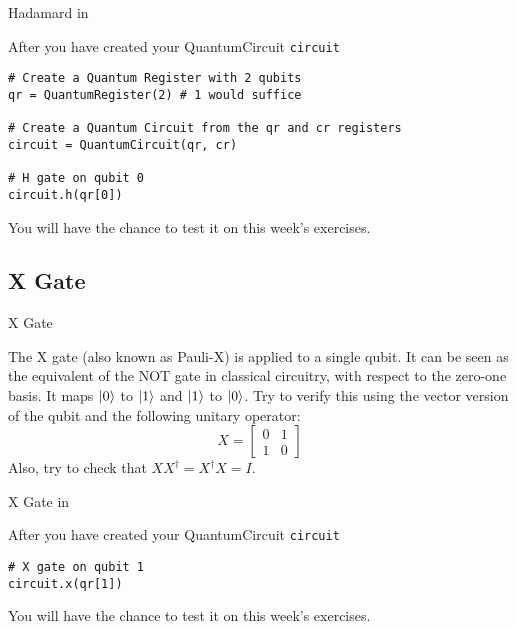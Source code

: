 \documentclass[aspectratio=43]{beamer}
\begin{document}
\begin{frame}[fragile]{Hadamard in \qk}
\begin{card}
    After you have created your QuantumCircuit \texttt{circuit}
    \begin{verbatim}
# Create a Quantum Register with 2 qubits
qr = QuantumRegister(2) # 1 would suffice

# Create a Quantum Circuit from the qr and cr registers
circuit = QuantumCircuit(qr, cr)

# H gate on qubit 0
circuit.h(qr[0])
    \end{verbatim}
    \begin{center}
            
    \end{center}
    You will have the chance to test it on this week's exercises.
\end{card}
\end{frame}


\subsection{X Gate}
\begin{frame}{X Gate}
\begin{card}
    The X gate (also known as Pauli-X) is applied to a single qubit. It can be seen as the equivalent of the NOT gate in classical circuitry, with respect to the zero-one basis. It maps $\ket{0}$ to $\ket{1}$ and $\ket{1}$ to $\ket{0}$. Try to verify this using the vector version of the qubit and the following unitary operator:
    \begin{equation*}
        X=\begin{bmatrix}0 & 1\\1 & 0\end{bmatrix}
    \end{equation*}
    Also, try to check that $XX^\dag=X^\dag X = I$.
\end{card}
\pagenumber
\end{frame}

\begin{frame}[fragile]{X Gate in \qk}
\begin{card}
    After you have created your QuantumCircuit \texttt{circuit}
    \begin{verbatim}
# X gate on qubit 1
circuit.x(qr[1])
    \end{verbatim}
    \begin{center}
            
    \end{center}
    You will have the chance to test it on this week's exercises.
\end{card}
\end{frame}
\end{document}
